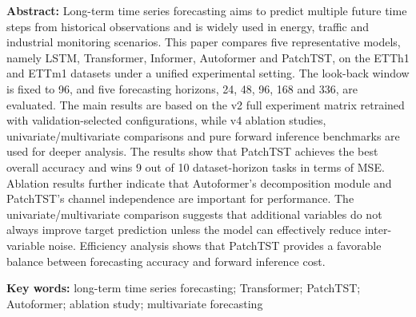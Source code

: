 \documentclass[UTF8,a4paper,zihao=-4]{ctexart}
\begin{document}
\vspace{0.6em}

\noindent\textbf{Abstract:}
Long-term time series forecasting aims to predict multiple future time steps from historical observations and is widely used in energy, traffic and industrial monitoring scenarios. This paper compares five representative models, namely LSTM, Transformer, Informer, Autoformer and PatchTST, on the ETTh1 and ETTm1 datasets under a unified experimental setting. The look-back window is fixed to 96, and five forecasting horizons, 24, 48, 96, 168 and 336, are evaluated. The main results are based on the v2 full experiment matrix retrained with validation-selected configurations, while v4 ablation studies, univariate/multivariate comparisons and pure forward inference benchmarks are used for deeper analysis. The results show that PatchTST achieves the best overall accuracy and wins 9 out of 10 dataset-horizon tasks in terms of MSE. Ablation results further indicate that Autoformer's decomposition module and PatchTST's channel independence are important for performance. The univariate/multivariate comparison suggests that additional variables do not always improve target prediction unless the model can effectively reduce inter-variable noise. Efficiency analysis shows that PatchTST provides a favorable balance between forecasting accuracy and forward inference cost.

\vspace{0.4em}
\noindent\textbf{Key words:} long-term time series forecasting; Transformer; PatchTST; Autoformer; ablation study; multivariate forecasting

\newpage

\end{document}
